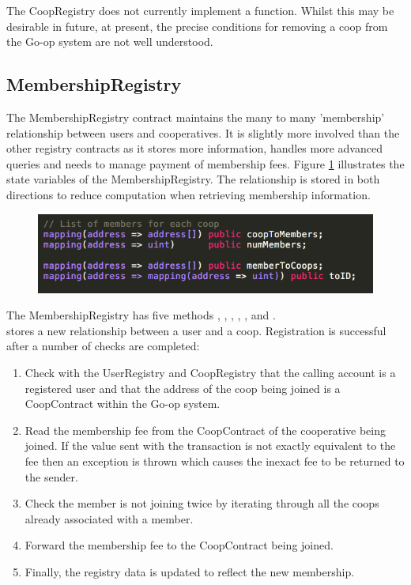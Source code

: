 The CoopRegistry does not currently implement a  function. Whilst this may be desirable in future, at present, the precise conditions for removing a coop from the Go-op system are not well understood. \\

\subsection{MembershipRegistry}
The MembershipRegistry contract maintains the many to many 'membership' relationship between users and cooperatives. It is slightly more involved than the other registry contracts as it stores more information, handles more advanced queries and needs to manage payment of membership fees. Figure \ref{fig:MemRegVars} illustrates the state variables of the MembershipRegistry. The relationship is stored in both directions to reduce computation when retrieving membership information. \\

\begin{figure}
\centering
\includegraphics[width=\textwidth]{Figures/MemRegVars}
\decoRule
\caption[]{ }
\label{fig:MemRegVars}
\end{figure}

The MembershipRegistry has five methods , , , , ,  and . \\

 stores a new relationship between a user and a coop. Registration is successful after a number of checks are completed:
\begin{enumerate}
\item Check with the UserRegistry and CoopRegistry that the calling account is a registered user and that the address of the coop being joined is a CoopContract within the Go-op system.

\item Read the membership fee from the CoopContract of the cooperative being joined. If the value sent with the transaction is not exactly equivalent to the fee then an exception is thrown which causes the inexact fee to be returned to the sender. 

\item Check the member is not joining twice by iterating through all the coops already associated with a member.

\item Forward the membership fee to the CoopContract being joined.

\item Finally, the registry data is updated to reflect the new membership.
\end{enumerate}

